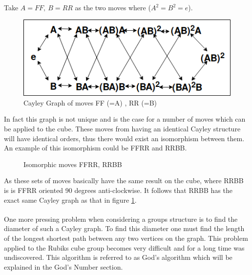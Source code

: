 \documentclass{article}
\newcounter{lem}[section]\setcounter{lem}{0}
\begin{document}
Take $A = FF,\ B = RR$ as the two moves where ($A^2 = B^2 = e$).
\begin{figure}
	\centering
	\includegraphics[scale=.6]{cayley.png}
    \caption{Cayley Graph of moves FF (=A) , RR (=B) }
    \label{fig:cayley}
\end{figure}
\vspace{10pt}
In fact this graph is not unique and is the case for a number of moves which can be applied to the cube. These moves from having an identical Cayley structure will have identical orders, thus there would exist an isomorphism between them. An example of this isomorphism could be FFRR and RRBB.


\newcommand{\ffrr}{[FFRR], F2,R2}
\newcommand{\rrbb}{[RRBB], R2,B2}
\begin{figure}[h]
\hspace{-0.5cm}
\RubikCubeSolvedWY%
\RubikRotation{\ffrr}%
\quad\SequenceBraceA{\SequenceName}{\ShowSequence{}{\Rubik}{\SequenceLong}}
%
\hspace{0.5cm}
\hspace{.5cm}
\RubikCubeSolvedWY%
\RubikRotation{\rrbb}%
\quad\SequenceBraceA{\SequenceName}{\ShowSequence{}{\Rubik}{\SequenceLong}}
%
\hspace{0.5cm}
\caption{Isomorphic moves FFRR, RRBB}
\label{fig:slice}
\end{figure}

As these sets of moves basically have the same result on the cube, where RRBB is is FFRR oriented 90 degrees anti-clockwise. It follows that RRBB has the exact same Cayley graph as that in figure \ref{fig:cayley}.
\paragraph*{}One more pressing problem when considering a groups structure is to find the diameter of such a Cayley graph. To find this diameter one must find the length of the longest shortest path between any two vertices on the graph. This problem applied to the Rubiks cube group becomes very difficult and for a long time was undiscovered. This algorithm is referred to as God's algorithm which will be explained in the God's Number section.
\end{document}
